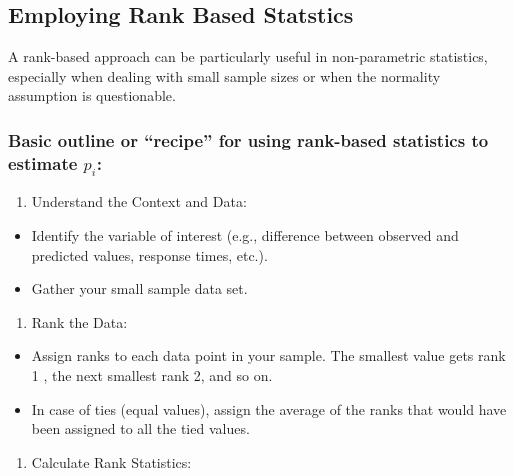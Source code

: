 \documentclass[
  12pt,
  a4paper,
]{article}
\providecommand{\tightlist}{%
  \setlength{\itemsep}{0pt}\setlength{\parskip}{0pt}}
\numberwithin{equation}{section}
\theoremstyle{plain}
\theoremstyle{definition}
\theoremstyle{remark}
\theoremstyle{note}
\begin{document}
\hypertarget{employing-rank-based-statstics}{%
\subsection{Employing Rank Based
Statstics}\label{employing-rank-based-statstics}}

A rank-based approach can be particularly useful in non-parametric
statistics, especially when dealing with small sample sizes or when the
normality assumption is questionable.

\hypertarget{basic-outline-or-recipe-for-using-rank-based-statistics-to-estimate-p_i}{%
\subsubsection{\texorpdfstring{Basic outline or ``recipe'' for using
rank-based statistics to estimate
\(p_i\):}{Basic outline or ``recipe'' for using rank-based statistics to estimate p\_i:}}\label{basic-outline-or-recipe-for-using-rank-based-statistics-to-estimate-p_i}}

\begin{enumerate}
\def\labelenumi{\arabic{enumi}.}
\tightlist
\item
  Understand the Context and Data:
\end{enumerate}

\begin{itemize}
\tightlist
\item
  Identify the variable of interest (e.g., difference between observed
  and predicted values, response times, etc.).
\item
  Gather your small sample data set.
\end{itemize}

\begin{enumerate}
\def\labelenumi{\arabic{enumi}.}
\setcounter{enumi}{1}
\tightlist
\item
  Rank the Data:
\end{enumerate}

\begin{itemize}
\tightlist
\item
  Assign ranks to each data point in your sample. The smallest value
  gets rank 1 , the next smallest rank 2, and so on.
\item
  In case of ties (equal values), assign the average of the ranks that
  would have been assigned to all the tied values.
\end{itemize}

\begin{enumerate}
\def\labelenumi{\arabic{enumi}.}
\setcounter{enumi}{2}
\tightlist
\item
  Calculate Rank Statistics:
\end{enumerate}
\end{document}
